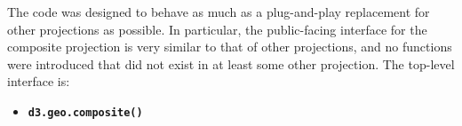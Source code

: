The code was designed to behave as much as a plug-and-play replacement for
  other projections as possible.
In particular, the public-facing interface for the composite projection is
  very similar to that of other projections, and no functions were introduced
  that did not exist in at least some other projection.
The top-level interface is:

\begin{itemize}
  \item[] \textbf{\texttt{d3.geo.composite()}}
\end{itemize}

